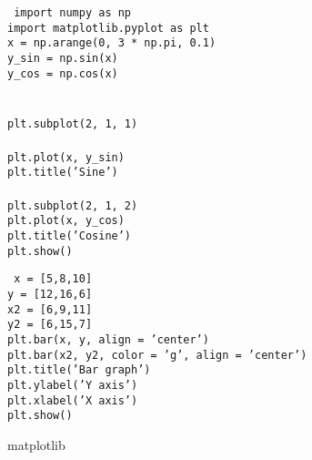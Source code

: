 \begin{frame}{}

  {\tt\small
    import numpy as np \\
    import matplotlib.pyplot as plt  \\[4mm]

    x = np.arange(0, 3 * np.pi, 0.1) \\
    y\_sin = np.sin(x) \\
    y\_cos = np.cos(x) \\[2mm]

    \\
    \\
    plt.subplot(2, 1, 1)\\
    \\
    plt.plot(x, y\_sin) \\
    plt.title('Sine')  \\
    \\
    plt.subplot(2, 1, 2) \\
    plt.plot(x, y\_cos) \\
    plt.title('Cosine') \\[2mm]
    plt.show()
  }
\end{frame}

\begin{frame}{}

  {\tt
    x = [5,8,10] \\
    y = [12,16,6]  \\[2mm]
    x2 = [6,9,11] \\
    y2 = [6,15,7] \\
    plt.bar(x, y, align = 'center') \\
    plt.bar(x2, y2, color = 'g', align = 'center') \\
    plt.title('Bar graph') \\
    plt.ylabel('Y axis') \\
    plt.xlabel('X axis')  \\[2mm]
    plt.show()
  }
\end{frame}

\begin{frame}
  \vfill
  \bf{\large{}}
  \vfill
\end{frame}

\begin{frame}{matplotlib}
\end{frame}

